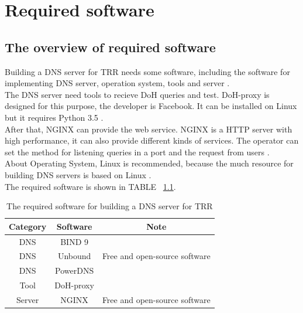 
\chapter{Required software}
\section{The overview of required software}

Building a DNS server for TRR needs some software, including the software for implementing DNS server, operation system, tools and server \cite{DNS_resources}.
\\

The DNS server need tools to recieve DoH queries and test. DoH-proxy is designed for this purpose, the developer is Facebook. It can be installed on Linux but it requires Python 3.5 \cite{doh_proxy}.
\\

After that, NGINX can provide the web service. NGINX is a HTTP server with high performance, it can also provide different kinds of services. The operator can set the method for listening queries in a port and the request from users \cite{NGINX_wiki}.
\\

About Operating System, Linux is recommended, because the much resource for building DNS servers is based on Linux \cite{configure_BIND}.
\\

The required software is shown in TABLE ~\ref{tab:required_software}.
\\

\begin{table}[hbt!]
    \centering
    \begin{tabular}{|c|c|c|}
        \hline
         Category & Software & Note\\    
        \hline
         DNS & BIND 9 & \\
        \hline
         DNS & Unbound & Free and open-source software\\
        \hline
         DNS & PowerDNS & \\
        \hline
         Tool & DoH-proxy &  \\
        \hline
        Server & NGINX & Free and open-source software\\
        \hline
    \end{tabular}
    \caption{The required software for building a DNS server for TRR}
    \label{tab:required_software}
\end{table}

